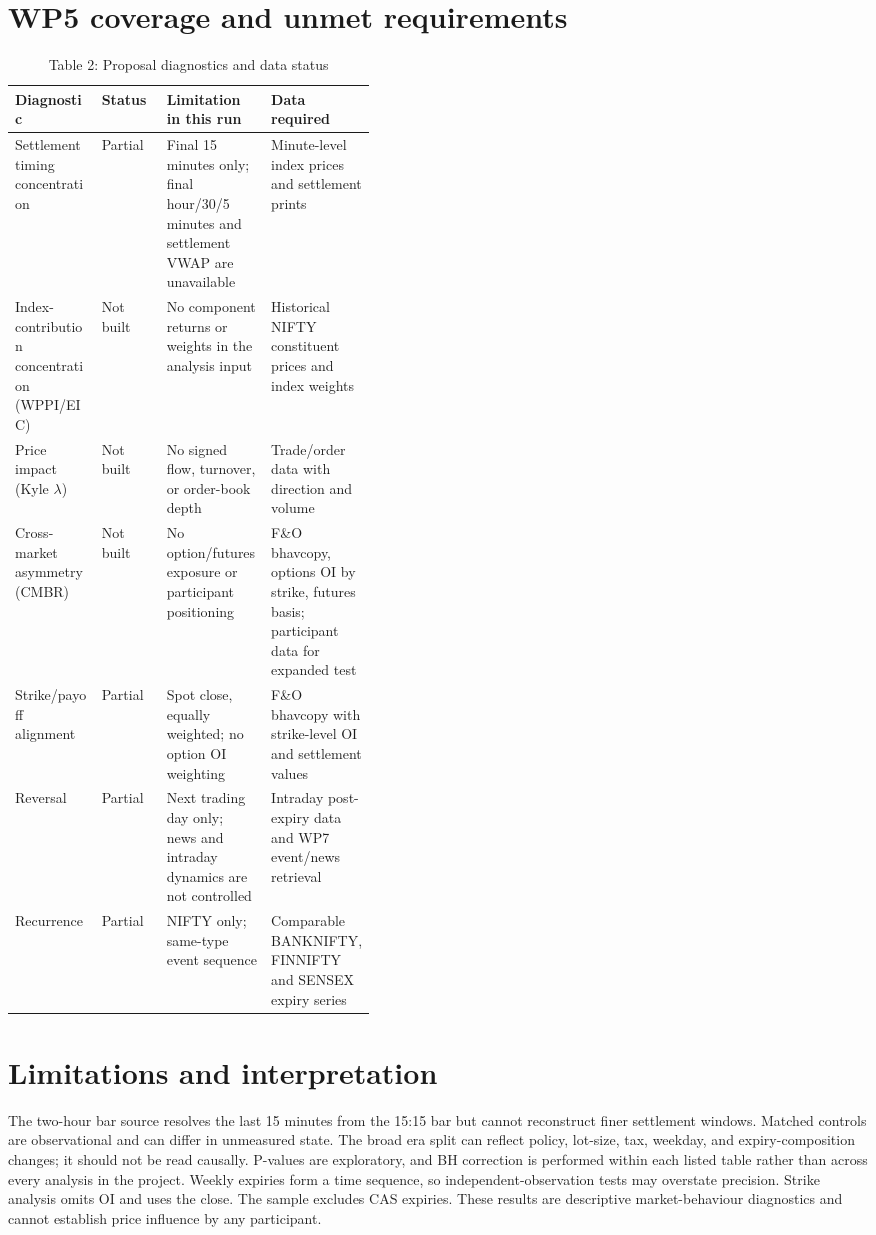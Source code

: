 \documentclass[11pt,a4paper]{article}
\begin{document}
\section{WP5 coverage and unmet requirements}
\begin{table}[htbp]\centering\caption{Table 2: Proposal diagnostics and data status}\small
\begin{tabularx}{\linewidth}{p{0.24\linewidth}p{0.18\linewidth}X X}\toprule Diagnostic & Status & Limitation in this run & Data required\\\midrule
Settlement timing concentration & Partial & Final 15 minutes only; final hour/30/5 minutes and settlement VWAP are unavailable & Minute-level index prices and settlement prints\\
Index-contribution concentration (WPPI/EIC) & Not built & No component returns or weights in the analysis input & Historical NIFTY constituent prices and index weights\\
Price impact (Kyle $\lambda$) & Not built & No signed flow, turnover, or order-book depth & Trade/order data with direction and volume\\
Cross-market asymmetry (CMBR) & Not built & No option/futures exposure or participant positioning & F\&O bhavcopy, options OI by strike, futures basis; participant data for expanded test\\
Strike/payoff alignment & Partial & Spot close, equally weighted; no option OI weighting & F\&O bhavcopy with strike-level OI and settlement values\\
Reversal & Partial & Next trading day only; news and intraday dynamics are not controlled & Intraday post-expiry data and WP7 event/news retrieval\\
Recurrence & Partial & NIFTY only; same-type event sequence & Comparable BANKNIFTY, FINNIFTY and SENSEX expiry series\\\bottomrule\end{tabularx}\end{table}

\section{Limitations and interpretation}
The two-hour bar source resolves the last 15 minutes from the 15:15 bar but cannot reconstruct finer settlement windows. Matched controls are observational and can differ in unmeasured state. The broad era split can reflect policy, lot-size, tax, weekday, and expiry-composition changes; it should not be read causally. P-values are exploratory, and BH correction is performed within each listed table rather than across every analysis in the project. Weekly expiries form a time sequence, so independent-observation tests may overstate precision. Strike analysis omits OI and uses the close. The sample excludes CAS expiries. These results are descriptive market-behaviour diagnostics and cannot establish price influence by any participant.
\end{document}
